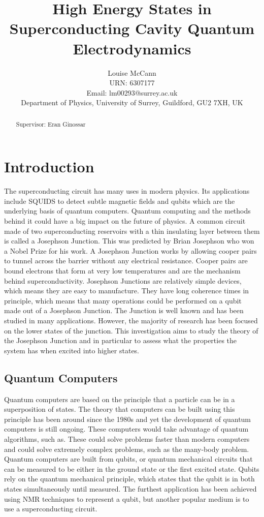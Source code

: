 \documentclass[11pt]{article}
\title{High Energy States in Superconducting Cavity Quantum Electrodynamics}
\author{Louise McCann \\ URN: 6307177 \\ Email: lm00293@surrey.ac.uk \\ Department of Physics, University of Surrey, Guildford, GU2 7XH, UK}
\begin{document}
    \maketitle

    \begin{abstract}
    Supervisor: Eran Ginossar
    \end{abstract}

    \clearpage

    \section{Introduction}
The superconducting circuit has many uses in modern physics. Its applications include SQUIDS to detect subtle magnetic fields and qubits which are the underlying basis of quantum computers. Quantum computing and the methods behind it could have a big impact on the future of physics. A common circuit made of two superconducting reservoirs with a thin insulating layer between them is called a Josephson Junction. This was predicted by Brian Josephson who won a Nobel Prize for his work. A Josephson Junction works by allowing cooper pairs to tunnel across the barrier without any electrical resistance. Cooper pairs are bound electrons that form at very low temperatures and are the mechanism behind superconductivity. Josephson Junctions are relatively simple devices, which means they are easy to manufacture. They have long coherence times in principle, which means that many operations could be performed on a qubit made out of a Josephson Junction. The Junction is well known and has been studied in many applications. However, the majority of research has been focused on the lower states of the junction. This investigation aims to study the theory of the Josephson Junction and in particular to assess what the properties the system has when excited into higher states.

  \subsection{Quantum Computers}
  Quantum computers are based on the principle that a particle can be in a superposition of states. The theory that computers can be built using this principle has been around since the 1980s and yet the development of quantum computers is still ongoing. These computers would take advantage of quantum algorithms, such as. These could solve problems faster than modern computers and could solve extremely complex problems, such as the many-body problem. Quantum computers are built from qubits, or quantum mechanical circuits that can be measured to be either in the ground state or the first excited state. Qubits rely on the quantum mechanical principle, which states that the qubit is in both states simultaneously until measured. The furthest application has been achieved using NMR techniques to represent a qubit, but another popular medium is to use a superconducting circuit.
\end{document}
